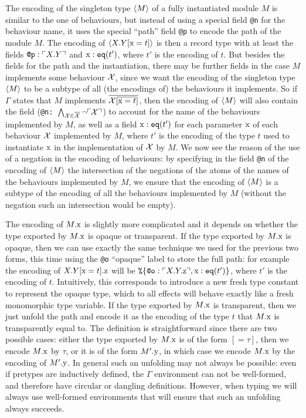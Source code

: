 \documentclass[a4paper,10pt]{article}
\begin{document}
The encoding of the singleton type $\langle M\rangle$ of a fully instantiated module $M$ is similar to the one of behaviours, but instead of using a special field \texttt{@n} for the behaviour name, it uses the special ``path'' field \texttt{@p} to encode the path of the module $M$. The encoding of $\langle X.Y[\text{\rm x}=t]\rangle$ is then a record type with at least the fields $\texttt{@p}: \ulcorner X.Y\urcorner$ and $\text{\rm x}:\texttt{eq}(t')$, where $t'$ is the encoding of $t$. But besides the fields for the path and the instantiation, there may be further fields in the case $M$ implements some behaviour $\mathcal{X}$, since  we want the encoding of the singleton type $\langle M\rangle$ to be a subtype of all (the encodings of) the behaviours it implements. So if $\Gamma$ states that $M$ implements $\overline{\mathcal{X}[\overline{\text{\rm x}=t}]}$, then the encoding of $\langle M\rangle$ will also contain the field (\texttt{@n: $\bigwedge_{\mathcal{X}\in\overline{\mathcal{X}}} \neg \ulcorner\mathcal{X}\urcorner$}) to account for the name of the behaviours implemented by $M$, as well as a field $\text{\rm x}:\texttt{eq}(t')$ for each parameter $\text{\rm x}$ of each behaviour $\mathcal{X}$ implemented by $M$, where $t'$ is the encoding of the type $t$ used to instantiate $\text{\rm x}$ in the implementation of $\mathcal{X}$ by $M$. We now see the reason of the use of a negation in the encoding of behaviours: by specifying in the field \texttt{@n} of the encoding of $\langle M\rangle$ the intersection of the negations of the atoms of the names of the behaviours implemented by $M$, we ensure that the encoding of $\langle M\rangle$ is a subtype of the encoding of all the behaviours implemented by $M$ (without the negation such an intersection would be empty). 

The encoding of $M.\text{\rm x}$ is slightly more complicated and it depends on whether the type exported by $M.\text{\rm x}$ is opaque or transparent. If the type exported by $M.\text{\rm x}$ is opaque, then we can use exactly the same technique we used for the previous two forms, this time using the \texttt{@o} ``opaque'' label to store the full path: for example the encoding of $X.Y[\text{\rm x}=t].\text{\rm z}$ will be $\texttt{\%}\!\left\{\texttt{@o}: \ulcorner X.Y.\text{\rm z}\urcorner,\text{\rm x}:\texttt{eq}(t')\right\}$, where $t'$ is the encoding of $t$. Intuitively, this corresponds to introduce a new fresh type constant to represent the opaque type, which to all effects will behave exactly like a fresh monomorphic type variable. If the type exported by $M.\text{\rm x}$ is transparent, then we just unfold the path and encode it as the encoding of the type $t$ that $M.\text{\rm x}$ is transparently equal to. The definition is straightforward since there are two possible cases: either the type exported by $M.\text{\rm x}$ is of the form $[=\tau]$, then we encode $M.\text{\rm x}$ by $\tau$, or it is of the form $M'.\text{\rm y}$, in which case we encode $M.\text{\rm x}$ by the encoding of $M'.\text{\rm y}$. In general such an unfolding may not always be possible: even if pretypes are inductively defined, the $\Gamma$ environment can not be well-formed, and therefore have circular or dangling definitions. However, when typing we will always use well-formed environments that will ensure that such an unfolding always succeeds. 
\end{document}
